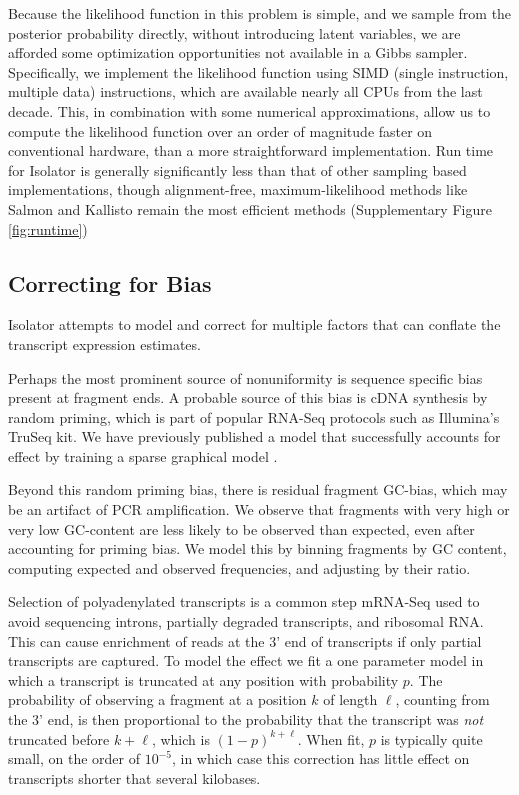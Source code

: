 \documentclass[twocolumn]{article}
\begin{document}
Because the likelihood function in this problem is simple, and we sample
from the posterior probability directly, without introducing latent
variables, we are afforded some optimization opportunities not available
in a Gibbs sampler. Specifically, we implement the likelihood function
using SIMD (single instruction, multiple data) instructions, which are
available nearly all CPUs from the last decade. This, in combination
with some numerical approximations, allow us to compute the likelihood
function over an order of magnitude faster on conventional hardware,
than a more straightforward implementation. Run time for Isolator is generally
significantly less than that of other sampling based implementations, though
alignment-free, maximum-likelihood methods like Salmon and Kallisto remain the
most efficient methods (Supplementary Figure \ref{fig:runtime})

\subsection{Correcting for Bias}\label{correcting-for-bias}

Isolator attempts to model and correct for multiple factors that can
conflate the transcript expression estimates.

Perhaps the most prominent source of nonuniformity is sequence specific
bias present at fragment ends. A probable source of this bias is cDNA
synthesis by random priming, which is part of popular RNA-Seq protocols
such as Illumina's TruSeq kit. We have previously published a model that
successfully accounts for effect by training a sparse graphical model
\cite{Jones:2012hg}.

Beyond this random priming bias, there is residual fragment GC-bias,
which may be an artifact of PCR amplification. We observe that fragments
with very high or very low GC-content are less likely to be observed
than expected, even after accounting for priming bias. We model this by
binning fragments by GC content, computing expected and observed
frequencies, and adjusting by their ratio.

Selection of polyadenylated transcripts is a common step mRNA-Seq used
to avoid sequencing introns, partially degraded transcripts, and
ribosomal RNA. This can cause enrichment of reads at the 3' end of
transcripts if only partial transcripts are captured. To model the
effect we fit a one parameter model in which a transcript is truncated
at any position with probability $p$. The probability of observing a
fragment at a position $k$ of length $\ell$, counting from the 3' end,
is then proportional to the probability that the transcript was
\emph{not} truncated before $k + \ell$, which is $(1-p)^{k + \ell}$.
When fit, $p$ is typically quite small, on the order of $10^{-5}$, in
which case this correction has little effect on transcripts shorter that
several kilobases.
\end{document}
